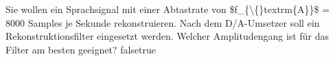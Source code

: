     {Sie wollen ein Sprachsignal mit einer Abtastrate von \$f\_\{\textbackslash\{\}textrm\{A\}\}\$ = 8000 Samples je Sekunde rekonstruieren. Nach dem D/A-Umsetzer soll ein Rekonstruktionsfilter eingesetzt werden. Welcher Amplitudengang ist für das Filter am besten geeignet?}
    {}
    {}
    {}
    {}
    {false}{true}